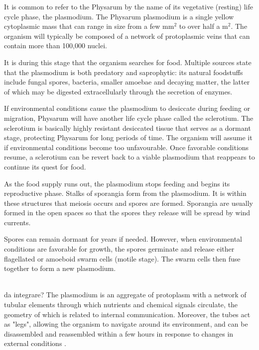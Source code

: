 It is common to refer to the Physarum by the name of its vegetative (resting) life cycle phase, the plasmodium. The Physarum plasmodium is a single yellow cytoplasmic mass that can range in size from a few mm$^2$ to over half a m$^2$. The organism will typically be composed of a network of protoplasmic veins that can contain more than 100,000 nuclei.
\par
It is during this stage that the organism searches for food. Multiple sources state that the plasmodium is both predatory and saprophytic: its natural foodstuffs include fungal spores, bacteria, smaller amoebae and decaying matter, the latter of which may be digested extracellularly through the secretion of enzymes.
\par
If environmental conditions cause the plasmodium to desiccate during feeding or migration, Physarum will have another life cycle phase called the sclerotium. The sclerotium is basically highly resistant desiccated tissue that serves as a dormant stage, protecting Physarum for long periods of time. The organism will assume it if environmental conditions become too
unfavourable. Once favorable conditions resume, a sclerotium can be revert back to a viable plasmodium that reappears to continue its quest for food.
\par
As the food supply runs out, the plasmodium stops feeding and begins its reproductive phase. Stalks of sporangia form from the plasmodium. It is within these structures that meiosis occurs and spores are formed. Sporangia are usually formed in the open spaces so that the spores they release will be spread by wind currents.
\par
Spores can remain dormant for years if needed. However, when environmental conditions are favorable for growth, the spores germinate and release either flagellated or amoeboid swarm cells (motile stage). The swarm cells then fuse together to form a new plasmodium. 

\par
\\ da integrare?
The plasmodium is an aggregate of protoplasm with a network of tubular elements through which nutrients and chemical signals circulate, the geometry of which is related to internal communication. Moreover, the tubes act as "legs", allowing the organism to navigate around its environment, and can be disassembled and reassembled within a few hours in response to changes in external conditions \cite{nakagaki2004obtaining}.


\par

